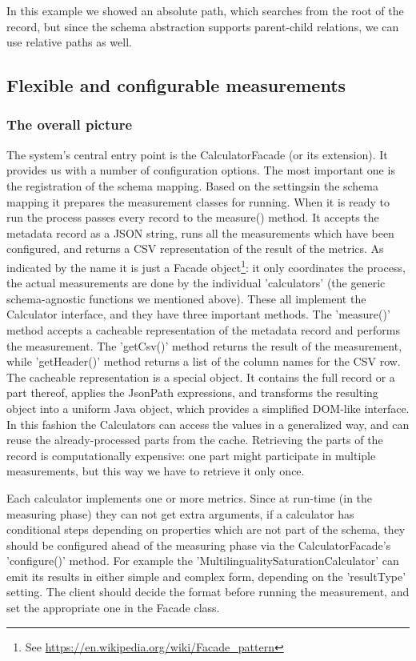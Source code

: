 In this example we showed an absolute path, which searches from the root of the record, but since the schema abstraction supports parent-child relations, we can use relative paths as well.

\subsection{Flexible and configurable measurements}

\subsubsection{The overall picture}

The system's central entry point is the CalculatorFacade (or its extension). It provides us with a number of configuration options. The most important one is the registration of the schema mapping. Based on the settingsin the schema mapping it prepares the measurement classes for running. When it is ready to run the process passes every record to the measure() method. It accepts the metadata record as a JSON string, runs all the measurements which have been configured, and returns a CSV representation of the result of the metrics. As indicated by the name it is just a Facade object\footnote{See \url{https://en.wikipedia.org/wiki/Facade_pattern}}: it only coordinates the process, the actual measurements are done by the individual 'calculators' (the generic schema-agnostic functions we mentioned above). These all implement the Calculator interface, and they have three important methods. The 'measure()' method accepts a cacheable representation of the metadata record and performs the measurement. The 'getCsv()' method returns the result of the measurement, while 'getHeader()' method returns a list of the column names for the CSV row. The cacheable representation is a special object. It contains the full record or a part thereof, applies the JsonPath expressions, and transforms the resulting object into a uniform Java object, which provides a simplified DOM-like interface. In this fashion the Calculators can access the values in a generalized way, and can reuse the already-processed parts from the cache. Retrieving the parts of the record is computationally expensive: one part might participate in multiple measurements, but this way we have to retrieve it only once.

Each calculator implements one or more metrics. Since at run-time (in the measuring phase) they can not get extra arguments, if a calculator has conditional steps depending on properties which are not part of the schema, they should be configured ahead of the measuring phase via the CalculatorFacade's 'configure()' method. For example the 'MultilingualitySaturationCalculator' can emit its results in either simple and complex form, depending on the 'resultType' setting. The client should decide the format before running the measurement, and set the appropriate one in the Facade class.

